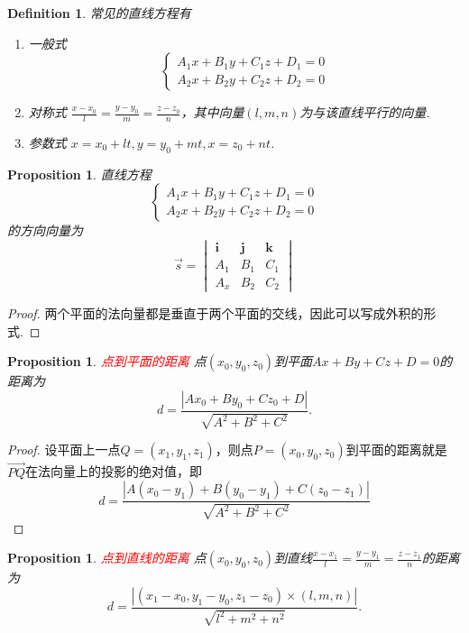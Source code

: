 \documentclass{article}
\newcommand{\mbf}[1]{\bm{#1}}
\newtheorem{proposition}[theorem]{Proposition}
\newtheorem{definition}[theorem]{Definition}
\newcommand{\redt}[1]{\textcolor{red}{#1}}
\begin{document}
\begin{definition}
\rm 常见的直线方程有
\begin{enumerate}
	\item 一般式
		$$
			\left\{
			\begin{array}{ll}
			A_1x+B_1y+C_1z+D_1 = 0 \\
			A_2x+B_2y+C_2z+D_2 = 0
			\end{array} \right.
		$$
	\item 对称式 $\frac{x-x_0}{l} = \frac{y-y_0}{m} = \frac{z-z_0}{n}$，其中向量$(l,m,n)$为与该直线平行的向量.
	\item 参数式 $x = x_0 + lt,y = y_0 + mt,x = z_0 + nt$. 	
\end{enumerate}
\end{definition}

\begin{proposition}
\rm 直线方程
$$
\left\{
			\begin{array}{ll}
			A_1x+B_1y+C_1z+D_1 = 0 \\
			A_2x+B_2y+C_2z+D_2 = 0
			\end{array} \right.
$$
的方向向量为
$$
\vec{s} = \begin{vmatrix}
\mbf{i} & \mbf{j} & \mbf{k} \\
A_1 & B_1 & C_1 \\
A_x & B_2 & C_2 
\end{vmatrix}
$$
\end{proposition}

\begin{proof}
两个平面的法向量都是垂直于两个平面的交线，因此可以写成外积的形式. 
\end{proof}

\begin{proposition}
\rm \redt{点到平面的距离} 点$(x_0,y_0,z_0)$到平面$Ax + By + Cz + D =0$的距离为
$$
d = \frac{|Ax_0 + By_0 + Cz_0 + D|}{\sqrt{A^2 + B^2 + C^2}}.
$$
\end{proposition}

\begin{proof}
设平面上一点$Q=(x_1,y_1,z_1)$，则点$P=(x_0,y_0,z_0)$到平面的距离就是$\vec{PQ}$在法向量上的投影的绝对值，即
$$
d = \frac{|A(x_0-y_1) + B(y_0-y_1) + C(z_0-z_1)|}{\sqrt{A^2 + B^2 + C^2}}
$$
\end{proof}

\begin{proposition}
\rm \redt{点到直线的距离} 点$(x_0,y_0,z_0)$到直线$\frac{x-x_1}{l} = \frac{y-y_1}{m} = \frac{z-z_1}{n}$的距离为
$$
d = \frac{|(x_1-x_0,y_1-y_0,z_1-z_0) \times (l,m,n)|}{\sqrt{l^2+m^2+n^2}}.
$$
\end{proposition}
\end{document}
